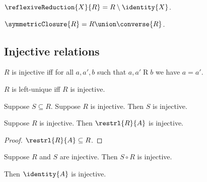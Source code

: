 \begin{definition}\label{reflexive_reduction}
    $\reflexiveReduction{X}{R} = R\setminus\identity{X}$.
\end{definition}

\begin{definition}\label{symmetric_closure}
    $\symmetricClosure{R} = R\union\converse{R}$.
\end{definition}





\subsection{Injective relations}

\begin{definition}\label{injective}
    $R$ is injective iff for all $a,a',b$ such that $a, a'\mathrel{R} b$ we have $a = a'$.
\end{definition}

\begin{abbreviation}\label{leftunique}
    $R$ is left-unique iff $R$ is injective.
\end{abbreviation}

\begin{proposition}\label{subseteq_of_injective_is_injective}
    Suppose $S\subseteq R$.
    Suppose $R$ is injective.
    Then $S$ is injective.
\end{proposition}

\begin{proposition}\label{restrl_injective}
    Suppose $R$ is injective.
    Then $\restrl{R}{A}$ is injective.
\end{proposition}
\begin{proof}
    $\restrl{R}{A}\subseteq R$.
\end{proof}

\begin{proposition}\label{circ_injective}
    Suppose $R$ and $S$ are injective.
    Then $S\circ R$ is injective.
\end{proposition}

\begin{proposition}\label{identity_injective}
    Then $\identity{A}$ is injective.
\end{proposition}

